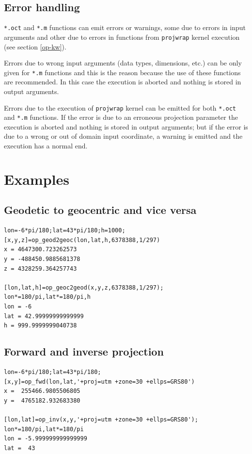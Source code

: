 \documentclass[10pt,a4paper]{article}
\begin{document}
\subsection{Error handling}

\texttt{*.oct} and \texttt{*.m} functions can emit errors or warnings, some due
to errors in input arguments and other due to errors in functions from
\texttt{projwrap} kernel execution (see section \ref{op-kw}).

Errors due to wrong input arguments (data types, dimensions, etc.) can be only
given for \texttt{*.m} functions and this is the reason because the use of these
functions are recommended. In this case the execution is aborted and nothing is
stored in output arguments.

Errors due to the execution of \texttt{projwrap} kernel can be emitted for both
\texttt{*.oct} and \texttt{*.m} functions. If the error is due to an erroneous
projection parameter the execution is aborted and nothing is stored in output
arguments; but if the error is due to a wrong or out of domain input coordinate,
a warning is emitted and the execution has a normal end.

\section{Examples}

\subsection{Geodetic to geocentric and vice versa}

\begin{verbatim}
lon=-6*pi/180;lat=43*pi/180;h=1000;
[x,y,z]=op_geod2geoc(lon,lat,h,6378388,1/297)
x = 4647300.723262573
y = -488450.9885681378
z = 4328259.364257743

[lon,lat,h]=op_geoc2geod(x,y,z,6378388,1/297);
lon*=180/pi,lat*=180/pi,h
lon = -6
lat = 42.99999999999999
h = 999.9999999040738
\end{verbatim}

\subsection{Forward and inverse projection}

\begin{verbatim}
lon=-6*pi/180;lat=43*pi/180;
[x,y]=op_fwd(lon,lat,'+proj=utm +zone=30 +ellps=GRS80')
x =  255466.9805506805
y =  4765182.932683380

[lon,lat]=op_inv(x,y,'+proj=utm +zone=30 +ellps=GRS80');
lon*=180/pi,lat*=180/pi
lon = -5.999999999999999
lat =  43
\end{verbatim}
\end{document}
